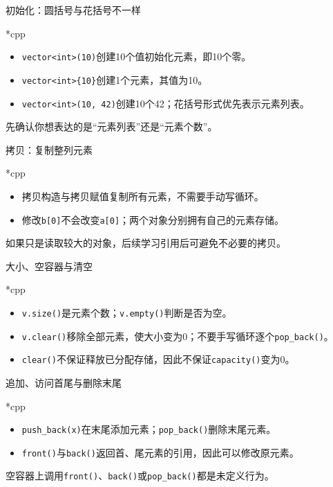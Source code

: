 \begin{frame}{初始化：圆括号与花括号不一样}
\begin{Code}*{cpp}\end{Code}
\begin{itemize}
\item \texttt{vector<int>(10)}创建10个值初始化元素，即10个零。
\item \texttt{vector<int>\{10\}}创建1个元素，其值为10。
\item \texttt{vector<int>(10, 42)}创建10个42；花括号形式优先表示元素列表。
\end{itemize}
\alert{先确认你想表达的是“元素列表”还是“元素个数”。}
\end{frame}

\begin{frame}{拷贝：复制整列元素}
\begin{Code}*{cpp}\end{Code}
\begin{itemize}
\item 拷贝构造与拷贝赋值复制所有元素，不需要手动写循环。
\item 修改\texttt{b[0]}不会改变\texttt{a[0]}；两个对象分别拥有自己的元素存储。
\end{itemize}
\medskip
\alert{如果只是读取较大的对象，后续学习引用后可避免不必要的拷贝。}
\end{frame}

\begin{frame}{大小、空容器与清空}
\begin{Code}*{cpp}\end{Code}
\begin{itemize}
\item \texttt{v.size()}是元素个数；\texttt{v.empty()}判断是否为空。
\item \texttt{v.clear()}移除全部元素，使大小变为0；不要手写循环逐个\texttt{pop\_back()}。
\item \texttt{clear()}不保证释放已分配存储，因此不保证\texttt{capacity()}变为0。
\end{itemize}
\end{frame}

\begin{frame}{追加、访问首尾与删除末尾}
\begin{Code}*{cpp}\end{Code}
\begin{itemize}
\item \texttt{push\_back(x)}在末尾添加元素；\texttt{pop\_back()}删除末尾元素。
\item \texttt{front()}与\texttt{back()}返回首、尾元素的引用，因此可以修改原元素。
\end{itemize}
\alert{空容器上调用\texttt{front()}、\texttt{back()}或\texttt{pop\_back()}都是未定义行为。}
\end{frame}

